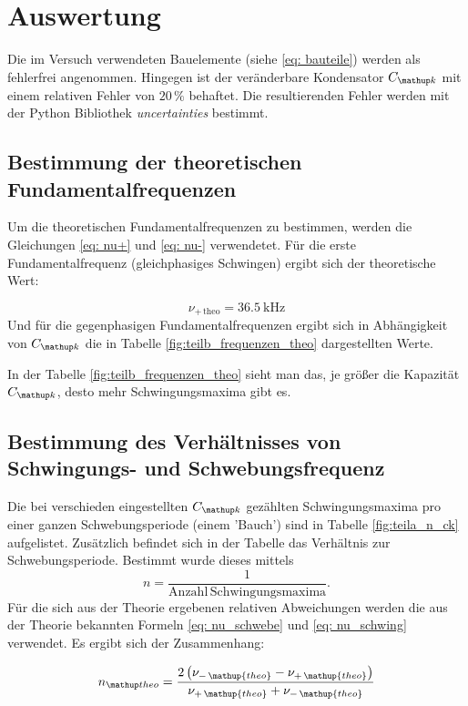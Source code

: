 \section{Auswertung}
Die im Versuch verwendeten Bauelemente (siehe \eqref{eq: bauteile})
werden als fehlerfrei angenommen.
Hingegen ist der veränderbare Kondensator $C\ua{k}$ mit
einem relativen Fehler von $20\,\%$ behaftet.
Die resultierenden Fehler werden mit der Python Bibliothek
\emph{uncertainties} bestimmt.

\subsection{Bestimmung der theoretischen Fundamentalfrequenzen}
Um die theoretischen Fundamentalfrequenzen zu bestimmen, werden die Gleichungen \eqref{eq: nu+} und
\eqref{eq: nu-} verwendetet.
Für die erste Fundamentalfrequenz (gleichphasiges Schwingen) ergibt sich der
theoretische Wert: %

\begin{equation}
\label{eq:nu_plu_theo}
\nu_{+\,\mathup{theo}}=\SI{36,5}{\kilo\hertz}
\end{equation}
Und für die gegenphasigen Fundamentalfrequenzen ergibt sich in Abhängigkeit von $C\ua{k}$ die in Tabelle \ref{fig:teilb_frequenzen_theo}  dargestellten Werte. %

In der Tabelle \ref{fig:teilb_frequenzen_theo} sieht man das, je größer die Kapazität $C\ua{k}$, desto
mehr Schwingungsmaxima gibt es.

\subsection{Bestimmung des Verhältnisses von Schwingungs- und Schwebungsfrequenz}
Die bei verschieden eingestellten $C\ua{k}$ gezählten Schwingungsmaxima pro einer ganzen %
Schwebungsperiode (einem 'Bauch') sind in Tabelle \ref{fig:teila_n_ck} aufgelistet. %
Zusätzlich befindet sich in der Tabelle das Verhältnis zur Schwebungsperiode. %
Bestimmt wurde dieses mittels %
\begin{equation*}
n=\frac{1}{\mathup{Anzahl \, Schwingungsmaxima}}.
\end{equation*}
Für die sich aus der Theorie ergebenen relativen Abweichungen werden die aus der Theorie
bekannten Formeln \eqref{eq: nu_schwebe} und \eqref{eq: nu_schwing} verwendet.
Es ergibt sich der Zusammenhang:

\begin{equation*}
n\ua{theo}=\frac{2\left(\nu_{-\,\mathup{theo}}-\nu_{+\,\mathup{theo}}\right)}{\nu_{+\,\mathup{theo}}+\nu_{-\,\mathup{theo}}}
\end{equation*}


